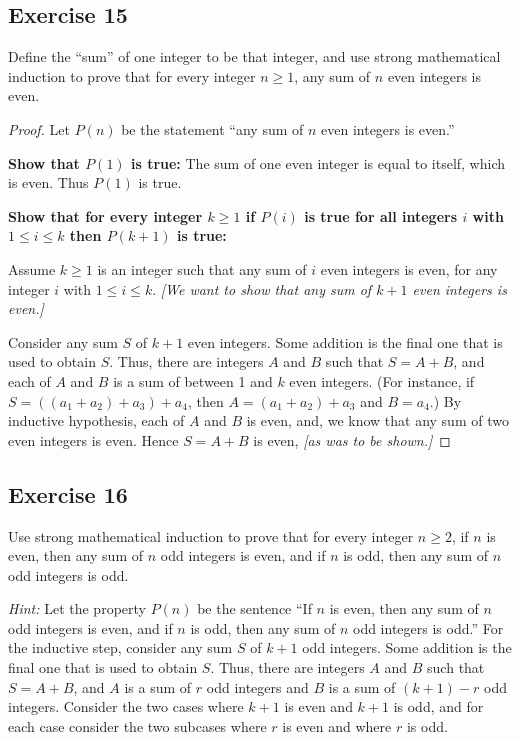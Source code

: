 \documentclass[14pt]{extarticle}
\begin{document}
\subsection{Exercise 15}
Define the “sum” of one integer to be that integer, and use strong mathematical induction to prove that for every integer $n \geq 1$, any sum of $n$ even integers is even.

\begin{proof}
Let $P(n)$ be the statement ``any sum of $n$ even integers is even.''

{\bf Show that $P(1)$ is true:} The sum of one even integer is equal to itself, which is even. Thus $P(1)$ is true.

{\bf Show that for every integer $k \geq 1$ if $P(i)$ is true for all integers $i$ with $1 \leq i \leq k$ then $P(k+1)$ is true:}

Assume $k \geq 1$ is an integer such that any sum of $i$ even integers is even, for any integer $i$ with $1 \leq i \leq k$. {\it [We want to show that any sum of $k+1$ even integers is even.]}

Consider any sum $S$ of $k+1$ even integers. 
Some addition is the final one that is used to obtain $S$. 
Thus, there are integers $A$ and $B$ such that $S = A + B$,
and each of $A$ and $B$ is a sum of between 1 and $k$ 
even integers. 
(For instance, if $S = ((a_1 + a_2) + a_3) + a_4$, then $A = (a_1 + a_2) + a_3$ and $B = a_4$.) 
By inductive hypothesis, each of $A$ and $B$ is even, and, 
we know that any sum of two even integers is even. Hence $S = A + B$ is even, {\it [as was to be shown.]}
\end{proof}

\subsection{Exercise 16}
Use strong mathematical induction to prove that for every integer $n \geq 2$, if $n$ is even, then any sum of $n$ odd integers is even, and if $n$ is odd, then any sum of $n$ odd integers is odd.

{\it Hint:} Let the property $P(n)$ be the sentence “If 
$n$ is even, then any sum of $n$ odd integers is even,
and if $n$ is odd, then any sum of $n$ odd integers is odd.”
For the inductive step, consider any sum $S$ of $k + 1$ odd integers. 
Some addition is the final one that is used to obtain $S$.
Thus, there are integers $A$ and $B$ such that $S = A + B$,
and $A$ is a sum of $r$ odd integers 
and $B$ is a sum of $(k + 1) - r$ odd integers. 
Consider the two cases where $k + 1$ is even and $k + 1$ is
odd, and for each case consider the two subcases where $r$
is even and where $r$ is odd.
\end{document}
